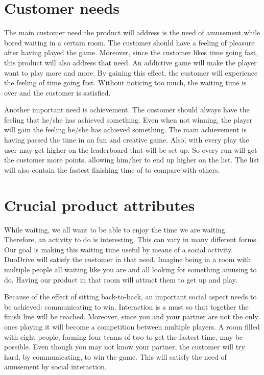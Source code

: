 \documentclass[11pt,twoside,a4paper]{article}
\begin{document}
\section{Customer needs}
The main customer need the product will address is the need of amusement while bored waiting in a certain room. The customer should have a feeling of pleasure after having played the game. Moreover, since the customer likes time going fast, this product will also address that need. An addictive game will make the player want to play more and more. By gaining this effect, the customer will experience the feeling of time going fast. Without noticing too much, the waiting time is over and the customer is satisfied.

Another important need is achievement. The customer should always have the feeling that he/she has achieved something. Even when not winning, the player will gain the feeling he/she has achieved something. The main achievement is having passed the time in an fun and creative game. Also, with every play the user may get higher on the leaderboard that will be set up. So every run will get the customer more points, allowing him/her to end up higher on the list. The list will also contain the fastest finishing time of to compare with others.


\section{Crucial product attributes}
While waiting, we all want to be able to enjoy the time we are waiting. Therefore, an activity to do is interesting. This can vary in many different forms. Our goal is making this waiting time useful by means of a social activity. DuoDrive will satisfy the customer in that need. Imagine being in a room with multiple people all waiting like you are and all looking for something amusing to do. Having our product in that room will attract them to get up and play.

Because of the effect of sitting back-to-back, an important social aspect needs to be achieved: communicating to win. Interaction is a must so that together the finish line will be reached. Moreover, since you and your partner are not the only ones playing it will become a competition between multiple players. A room filled with eight people, forming four teams of two to get the fastest time, may be possible. Even though you may not know your partner, the customer will try hard, by communicating, to win the game. This will satisfy the need of amusement by social interaction.
\end{document}
